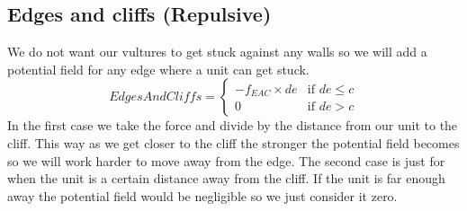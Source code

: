 	\subsection*{Edges and cliffs (Repulsive)}
		We do not want our vultures to get stuck against any walls so we will add a potential field for any edge where a unit can get stuck.
		\begin{displaymath}
			EdgesAndCliffs = \begin{cases}
					-f_{EAC} \times {de} & \text{if } de \leq c\\
					0 & \text{if } de > c
				\end{cases}		
		\end{displaymath}
In the first case we take the force and divide by the distance from our unit to the cliff. This way as we get closer to the cliff the stronger the potential field becomes so we will work harder to move away from the edge.
The second case is just for when the unit is a certain distance away from the cliff. If the unit is far enough away the potential field would be negligible so we just consider it zero.	
	